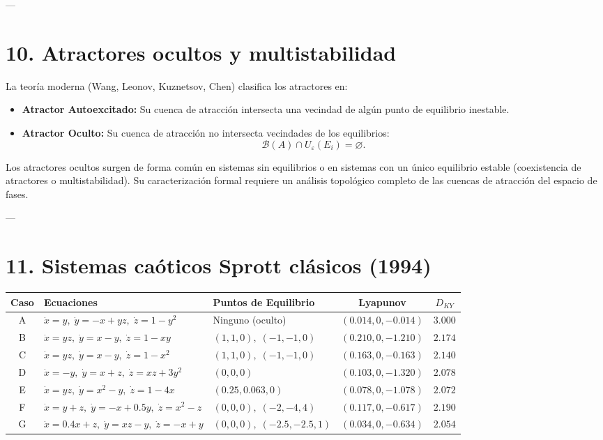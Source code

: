 \documentclass[11pt]{article}
\begin{document}
---

\section{10. Atractores ocultos y multistabilidad}

La teoría moderna (Wang, Leonov, Kuznetsov, Chen) clasifica los atractores en:
\begin{itemize}
  \item \textbf{Atractor Autoexcitado:} Su cuenca de atracción intersecta una vecindad de algún punto de equilibrio inestable.
  \item \textbf{Atractor Oculto:} Su cuenca de atracción no intersecta vecindades de los equilibrios:
        \[
        \mathcal{B}(A) \cap U_\varepsilon(E_i) = \varnothing.
        \]
\end{itemize}
Los atractores ocultos surgen de forma común en sistemas sin equilibrios o en sistemas con un único equilibrio estable (coexistencia de atractores o multistabilidad). Su caracterización formal requiere un análisis topológico completo de las cuencas de atracción del espacio de fases.

---

\section{11. Sistemas caóticos Sprott clásicos (1994)}

\begin{center}
\begin{tabular}{cllcc}
\toprule
Caso & Ecuaciones & Puntos de Equilibrio & Lyapunov & $D_{KY}$ \\
\midrule
A & $\dot{x}=y, \; \dot{y}=-x+yz, \; \dot{z}=1-y^2$ & Ninguno (oculto) & $(0.014, 0, -0.014)$ & $3.000$ \\
B & $\dot{x}=yz, \; \dot{y}=x-y, \; \dot{z}=1-xy$ & $(1,1,0), \; (-1,-1,0)$ & $(0.210, 0, -1.210)$ & $2.174$ \\
C & $\dot{x}=yz, \; \dot{y}=x-y, \; \dot{z}=1-x^2$ & $(1,1,0), \; (-1,-1,0)$ & $(0.163, 0, -0.163)$ & $2.140$ \\
D & $\dot{x}=-y, \; \dot{y}=x+z, \; \dot{z}=xz+3y^2$ & $(0,0,0)$ & $(0.103, 0, -1.320)$ & $2.078$ \\
E & $\dot{x}=yz, \; \dot{y}=x^2-y, \; \dot{z}=1-4x$ & $(0.25, 0.063, 0)$ & $(0.078, 0, -1.078)$ & $2.072$ \\
F & $\dot{x}=y+z, \; \dot{y}=-x+0.5y, \; \dot{z}=x^2-z$ & $(0,0,0), \; (-2,-4,4)$ & $(0.117, 0, -0.617)$ & $2.190$ \\
G & $\dot{x}=0.4x+z, \; \dot{y}=xz-y, \; \dot{z}=-x+y$ & $(0,0,0), \; (-2.5,-2.5,1)$ & $(0.034, 0, -0.634)$ & $2.054$ \\
\bottomrule
\end{tabular}
\end{center}
\end{document}

